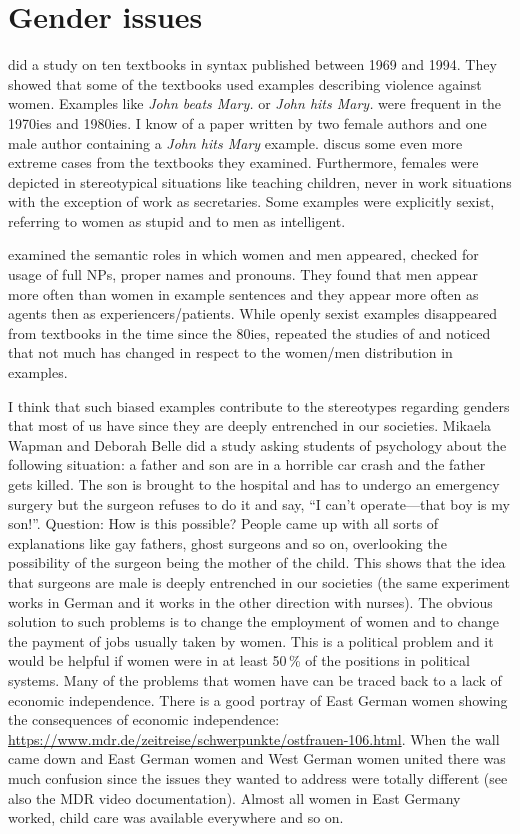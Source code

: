 \section*{Gender issues}


\citet{MB97a} did a study on ten textbooks in syntax published between 1969 and 1994. They showed
that some of the textbooks used examples describing violence against women. Examples like \emph{John
  beats Mary.} or \emph{John hits Mary.} were frequent in the 1970ies and 1980ies. I know of a paper
written by two female authors and one male author containing a \emph{John hits Mary} example. \citet[]{MB97a} discus some even more extreme cases from the textbooks they examined. Furthermore, females were
depicted in stereotypical situations like teaching children, never in work situations with the
exception of work as secretaries. Some examples were explicitly sexist, referring to women as stupid
and to men as intelligent. 


\citeauthor{MB97a} examined the semantic roles in which women and men appeared, checked for
usage of full NPs, proper names and pronouns. They found that men appear more often than women
in example sentences and they appear more often as agents then as experiencers/patients. While
openly sexist examples disappeared from textbooks in the time since the 80ies, \citet{PCKSDMC2017a}
repeated the studies of \citeauthor{MB97a} and noticed that not much has changed in respect to the
women/men distribution in examples. 

I think that such biased examples contribute to the stereotypes regarding genders that most of us
have since they are deeply entrenched in our societies. Mikaela Wapman and Deborah Belle did a study
asking students of psychology about the following situation: a father and son are in a horrible car
crash and the father gets killed. The son is brought to the hospital and has to undergo an emergency
surgery but the surgeon refuses to do it and say, ``I can’t operate—that boy is my son!''. Question:
How is this possible? People came up with all sorts of explanations like gay fathers, ghost surgeons
and so on, overlooking the possibility of the surgeon being the mother of the child. This shows that
the idea that surgeons are male is deeply entrenched in our societies (the same experiment works in
German and it works in the other direction with nurses). The obvious solution to such problems is to
change the employment of women and to change the payment of jobs usually taken by women. This is a
political problem and it would be helpful if women were in at least 50\,\% of the positions in
political systems. Many of the problems that women have can be traced back to a lack of economic
independence. There is a good portray of East German women showing the consequences of economic
independence: \url{https://www.mdr.de/zeitreise/schwerpunkte/ostfrauen-106.html}. When the wall came
down and East German women and West German women united there was much confusion since the issues
they wanted to address were totally different (see also the MDR video documentation). Almost all women in
East Germany worked, child care was available everywhere and so on.

